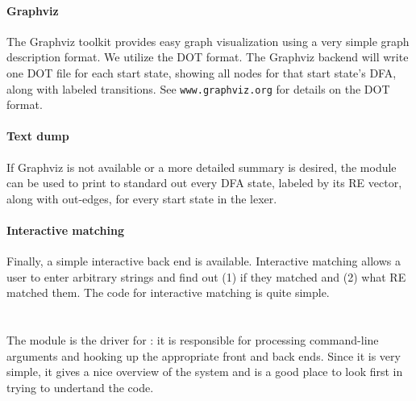 \paragraph{Graphviz}

The Graphviz toolkit provides easy graph visualization using a very simple
graph description format.  We utilize the DOT format.  The Graphviz backend
will write one DOT file for each start state, showing all nodes for that start
state's DFA, along with labeled transitions.  See \texttt{www.graphviz.org} for
details on the DOT format.

\paragraph{Text dump}

If Graphviz is not available or a more detailed summary is desired, the
 module can be used to print to standard out every DFA state,
labeled by its RE vector, along with out-edges, for every start state in the
lexer.

\paragraph{Interactive matching}

Finally, a simple interactive back end is available.  Interactive matching
allows a user to enter arbitrary strings and find out (1) if they matched and
(2) what RE matched them.  The code for interactive matching is quite simple.

\section{}

The  module is the driver for \ulex{}: it is responsible for processing
command-line arguments and hooking up the appropriate front and back ends. 
Since it is very simple, it gives a nice overview of the system and is a good
place to look first in trying to undertand the code.